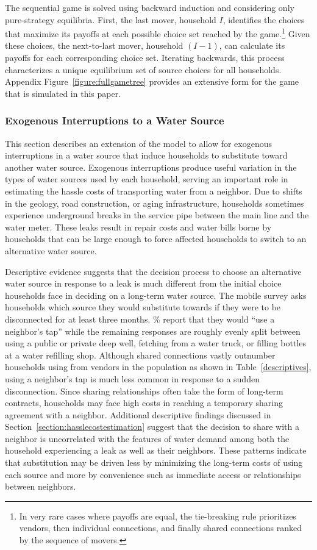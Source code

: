 \documentclass[12pt]{article}
\begin{document}
The sequential game is solved using backward induction and considering only pure-strategy equilibria.  First, the last mover, household $I$, identifies the choices that maximize its payoffs at each possible choice set reached by the game.\footnote{In very rare cases where payoffs are equal, the tie-breaking rule prioritizes vendors, then individual connections, and finally shared connections ranked by the sequence of movers.}  Given these choices, the next-to-last mover, household $(I-1)$, can calculate its payoffs for each corresponding choice set.  Iterating backwards, this process characterizes a unique equilibrium set of source choices for all households.  Appendix Figure~\ref{figure:fullgametree} provides an extensive form for the game that is simulated in this paper.


\subsubsection{Exogenous Interruptions to a Water Source}\label{section:hasslemodel}

This section describes an extension of the model to allow for exogenous interruptions in a water source that induce households to substitute toward another water source.  Exogenous interruptions produce useful variation in the types of water sources used by each household, serving an important role in estimating the hassle costs of transporting water from a neighbor.  Due to shifts in the geology, road construction, or aging infrastructure, households sometimes experience underground breaks in the service pipe between the main line and the water meter.  These leaks result in repair costs and water bills borne by households that can be large enough to force affected households to switch to an alternative water source.

Descriptive evidence suggests that the decision process to choose an alternative water source in response to a leak is much different from the initial choice households face in deciding on a long-term water source.  The mobile survey asks households which source they would substitute towards if they were to be disconnected for at least three months.  \unskip\% report that they would ``use a neighbor's tap'' while the remaining responses are roughly evenly split between using a public or private deep well, fetching from a water truck, or filling bottles at a water refilling shop.  Although shared connections vastly outnumber households using from vendors in the population as shown in Table~\ref{descriptives}, using a neighbor's tap is much less common in response to a sudden disconnection.  Since sharing relationships often take the form of long-term contracts, households may face high costs in reaching a temporary sharing agreement with a neighbor.  Additional descriptive findings discussed in Section~\ref{section:hasslecostestimation} suggest that the decision to share with a neighbor is uncorrelated with the features of water demand among both the household experiencing a leak as well as their neighbors.  These patterns indicate that substitution may be driven less by minimizing the long-term costs of using each source and more by convenience such as immediate access or relationships between neighbors.
\end{document}
